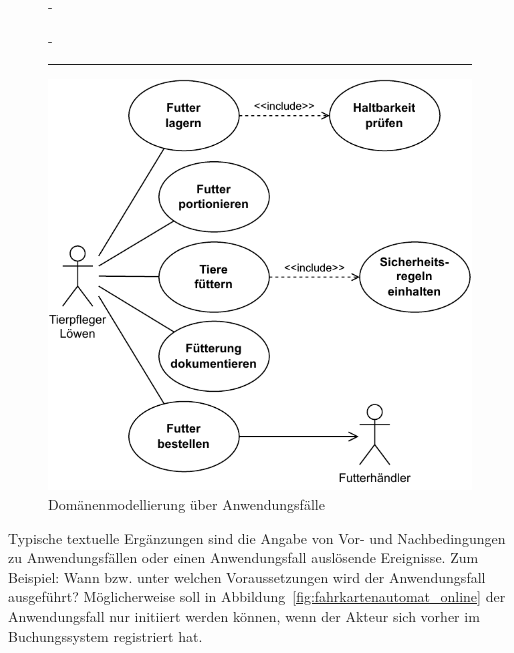 \begin{figure}[h!]
\begin{addmargin*}[0cm]{-\marginparwidth}
\begin{addmargin*}[0cm]{-\marginparsep}
\begin{minipage}[c]{7.5cm}
			\end{minipage}
			\begin{minipage}[c]{0.1cm} 
				\centering
				{\color{FernUni-MI-green}\rule{1pt}{90mm}} %
			\end{minipage}
			\begin{minipage}[c]{9cm}
				\centering
				\includegraphics[scale=0.8]{Bilder/Kapitel-6/anwendungsfall_tiere_fuettern_loewen.pdf}
			\end{minipage}
			\vspace{\baselineskip} %
			\caption{Domänenmodellierung über Anwendungsfälle}
			\label{fig:anwendungsfall_tiere_fuettern}
		\end{addmargin*}
	\end{addmargin*}
\end{figure}

\vspace{1cm} %

Typische textuelle Ergänzungen sind die Angabe von Vor- und Nachbedingungen zu Anwendungsfällen oder einen Anwendungsfall auslösende Ereignisse. Zum Beispiel: Wann bzw. unter welchen Voraussetzungen wird der Anwendungsfall ausgeführt? Möglicherweise soll in Abbildung~\ref{fig:fahrkartenautomat_online} der Anwendungsfall  nur initiiert werden können, wenn der Akteur sich vorher im Buchungssystem registriert hat. 

